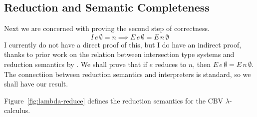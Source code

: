 \documentclass{tufte-handout}
\newcommand{\LAM}[1]{\lambda #1.\,}
\newcommand{\ext}[3]{#3(#1{\mapsto}#2)}
\begin{document}


\subsection{Reduction and Semantic Completeness}

Next we are concerned with proving the second step of correctness.
\[
    I\,e\,\emptyset = n \implies E\,e\,\emptyset = E\,n\,\emptyset
\]
I currently do not have a direct proof of this, but I do have an
indirect proof, thanks to prior work on the relation between
intersection type systems and reduction semantics by
\citet{Alessi:2006aa}. We shall prove that if $e$ reduces to $n$, then
$E\,e\,\emptyset = E\,n\,\emptyset$.  The connectiion between
reduction semantics and interpreters is standard, so we shall have our
result.

Figure~\ref{fig:lambda-reduce} defines the reduction semantics for the
CBV $\lambda$-calculus.
\end{document}
